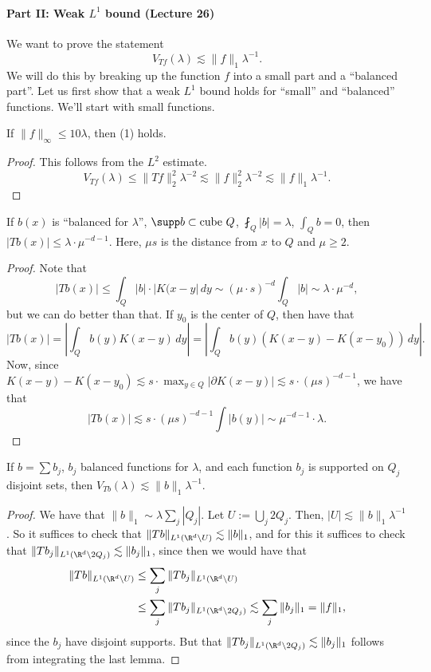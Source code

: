 \paragraph{Part II: Weak $L^1$ bound (Lecture 26)}
We want to prove the statement
\[V_{Tf}(\lambda)\lesssim\|f\|_1\lambda^{-1}.\tag{1}\]
We will do this by breaking up the function $f$ into a small part and a ``balanced part''. Let us first show that a weak $L^1$ bound holds for ``small'' and ``balanced'' functions. We'll start with small functions.
\begin{lemma}
If $\|f\|_\infty\leq10\lambda$, then (1) holds.
\end{lemma}
\begin{proof}
This follows from the $L^2$ estimate.
\[V_{Tf}(\lambda)\leq\|Tf\|_2^2\lambda^{-2}\lesssim\|f\|_2^2\lambda^{-2}\lesssim\|f\|_1\lambda^{-1}.\]
\end{proof}
\begin{lemma}
If $b(x)$ is ``balanced for $\lambda$'', $\supp b\subset\text{cube }Q$, $\fint_Q|b|=\lambda$, $\int_Qb=0$, then $|Tb(x)|\leq\lambda\cdot\mu^{-d-1}$. Here, $\mu s$ is the distance from $x$ to $Q$ and $\mu\geq2$.
\end{lemma}
\begin{proof}
Note that
\[|Tb(x)|\leq\int_Q|b|\cdot|K(x-y|\,dy\sim(\mu\cdot s)^{-d}\int_Q|b|\sim\lambda\cdot\mu^{-d},\]
but we can do better than that. If $y_0$ is the center of $Q$, then have that
\[|Tb(x)|=\left|\int_Qb(y)K(x-y)\,dy\right|=\left|\int_Qb(y)(K(x-y)-K(x-y_0))\,dy\right|.\]
Now, since $K(x-y)-K(x-y_0)\lesssim s\cdot\max_{y\in Q}|\partial K(x-y)|\lesssim s\cdot(\mu s)^{-d-1}$, we have that
\[|Tb(x)|\lesssim s\cdot(\mu s)^{-d-1}\int|b(y)|\sim\mu^{-d-1}\cdot\lambda.\]
\end{proof}
\begin{lemma}
If $b=\sum b_j$, $b_j$ balanced functions for $\lambda$, and each function $b_j$ is supported on $Q_j$ disjoint sets, then $V_{Tb}(\lambda)\lesssim\|b\|_1\lambda^{-1}$.
\end{lemma}
\begin{proof}
We have that $\|b\|_1\sim\lambda\sum_j|Q_j|$. Let $U:=\bigcup_j2Q_j$. Then, $|U|\lesssim\|b\|_1\lambda^{-1}$. So it suffices to check that $\|Tb\|_{L^1(\R^d\setminus U)}\lesssim\|b\|_1$, and for this it suffices to check that $\|Tb_j\|_{L^1(\R^d\setminus2Q_j)}\lesssim\|b_j\|_1$, since then we would have that
\begin{align*}
\|Tb\|_{L^1(\R^d\setminus U)}&\leq\sum_j\|Tb_j\|_{L^1(\R^d\setminus U)}\\
&\leq\sum_j\|Tb_j\|_{L^1(\R^d\setminus2Q_j)}\lesssim\sum_j\|b_j\|_1=\|f\|_1,
\end{align*}
since the $b_j$ have disjoint supports. But that $\|Tb_j\|_{L^1(\R^d\setminus2Q_j)}\lesssim\|b_j\|_1$ follows from integrating the last lemma.
\end{proof}
